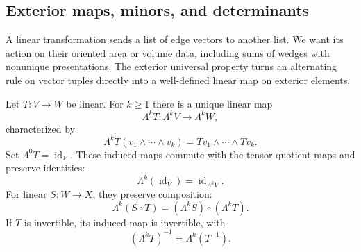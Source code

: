 \subsection{Exterior maps, minors, and determinants}

A linear transformation sends a list of edge vectors to another list.
We want its action on their oriented area or volume data, including sums
of wedges with nonunique presentations. The exterior universal property turns an alternating rule on vector
tuples directly into a well-defined linear map on exterior elements.

\begin{proposition}\label{prop:exterior-maps}
Let $T:V\to W$ be linear. For $k\geq1$ there is a unique linear map
\[
\Lambda^kT:\Lambda^kV\longrightarrow\Lambda^kW,
\]
characterized by
\[
\Lambda^kT(v_1\wedge\cdots\wedge v_k)=Tv_1\wedge\cdots\wedge Tv_k.
\]
Set $\Lambda^0T=\operatorname{id}_F$. These induced maps commute with the
tensor quotient maps and preserve identities:
\[
\Lambda^k(\operatorname{id}_V)=\operatorname{id}_{\Lambda^kV}.
\]
For linear $S:W\to X$, they preserve composition:
\[
\Lambda^k(S\circ T)=(\Lambda^kS)\circ(\Lambda^kT).
\]
If $T$ is invertible, its induced map is invertible, with
\[
(\Lambda^kT)^{-1}=\Lambda^k(T^{-1}).
\]
\end{proposition}

